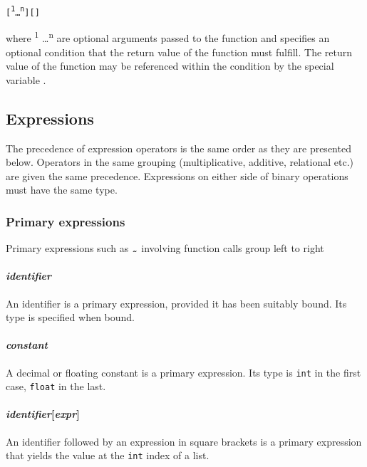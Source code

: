 \begin{alltt}
\quad \term{\midtilde}  [ \textsuperscript{1} \dots {}\textsuperscript{n} ] [ \term{|}  ]
\end{alltt}

where  \textsuperscript{1} \dots {}\textsuperscript{n}  are optional arguments passed to the function and \term{|}  specifies an optional condition that the return value of the function must fulfill. The return value of the function may be referenced within the condition by the special variable \term{\$}.

\subsection{Expressions}

The precedence of expression operators is the same order as they are presented below. Operators in the same grouping (multiplicative, additive, relational etc.) are given the same precedence. Expressions on either side of binary operations must have the same type. 

\subsubsection{Primary expressions}
Primary expressions such as $\midtilde$ involving function calls group left to right

\paragraph{\textit{identifier}}
An identifier is a primary expression, provided it has been suitably bound. Its type is specified when bound. 

\paragraph{\textit{constant}}
A decimal or floating constant is a primary expression. Its type is \texttt{int} in the first case, \texttt{float} in the last. 

\paragraph{\textit{identifier}[\textit{expr}]}
An identifier followed by an expression in square brackets is a primary expression that yields the value at the \texttt{int}  index of a list.

